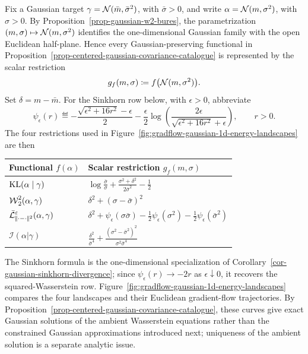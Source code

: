 Fix a Gaussian target $\gamma=\mathcal{N}(\bar m,\bar\sigma^2)$, with $\bar\sigma>0$, and write $\alpha=\mathcal{N}(m,\sigma^2)$, with $\sigma>0$. By Proposition~\ref{prop-gaussian-w2-bures}, the parametrization $(m,\sigma)\mapsto\mathcal{N}(m,\sigma^2)$ identifies the one-dimensional Gaussian family with the open Euclidean half-plane. Hence every Gaussian-preserving functional in Proposition~\ref{prop-centered-gaussian-covariance-catalogue} is represented by the scalar restriction
\[
	g_f(m,\sigma)\coloneqq f\bigl(\mathcal{N}(m,\sigma^2)\bigr).
\]
Set $\delta=m-\bar m$. For the Sinkhorn row below, with $\epsilon>0$, abbreviate
\[
	\psi_\epsilon(r)
	\eqdef
	-\frac{\sqrt{\epsilon^2+16r^2}-\epsilon}{2}
	-\frac{\epsilon}{2}
	\log\!\left(
		\frac{2\epsilon}{\sqrt{\epsilon^2+16r^2}+\epsilon}
	\right),
	\qquad r>0.
\]
The four restrictions used in Figure~\ref{fig:gradflow-gaussian-1d-energy-landscapes} are then
\begin{center}
\begingroup
\small
\renewcommand{\arraystretch}{1.55}
\begin{tabularx}{\linewidth}{>{\raggedright\arraybackslash}p{.34\linewidth}>{\raggedright\arraybackslash}X}
	\hline
	Functional $f(\alpha)$ & Scalar restriction $g_f(m,\sigma)$ \\
	\hline
	$\operatorname{KL}(\alpha\mid\gamma)$
	& $\displaystyle
	\log\frac{\bar\sigma}{\sigma}
	+\frac{\sigma^2+\delta^2}{2\bar\sigma^2}-\frac12$
	\\
	$\operatorname{\mathcal{W}}_2^2(\alpha,\gamma)$
	& $\displaystyle \delta^2+(\sigma-\bar\sigma)^2$
	\\
	$\displaystyle \bar{\mathcal{L}}_{|\!| \cdot-\cdot |\!|^2}^{\varepsilon}(\alpha,\gamma)$
	& $\displaystyle
	\delta^2+\psi_\epsilon(\sigma\bar\sigma)
	-\frac12\psi_\epsilon(\sigma^2)
	-\frac12\psi_\epsilon(\bar\sigma^2)$
	\\
	$\mathcal I(\alpha|\gamma)$
	& $\displaystyle
	\frac{\delta^2}{\bar\sigma^4}
	+\frac{(\sigma^2-\bar\sigma^2)^2}{\sigma^2\bar\sigma^4}$
	\\
	\hline
\end{tabularx}
\endgroup
\end{center}
The Sinkhorn formula is the one-dimensional specialization of Corollary~\ref{cor-gaussian-sinkhorn-divergence}; since $\psi_\epsilon(r)\to-2r$ as $\epsilon\downarrow0$, it recovers the squared-Wasserstein row. Figure~\ref{fig:gradflow-gaussian-1d-energy-landscapes} compares the four landscapes and their Euclidean gradient-flow trajectories. By Proposition~\ref{prop-centered-gaussian-covariance-catalogue}, these curves give exact Gaussian solutions of the ambient Wasserstein equations rather than the constrained Gaussian approximations introduced next; uniqueness of the ambient solution is a separate analytic issue.

